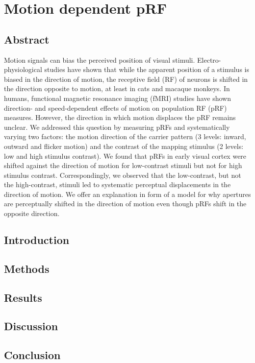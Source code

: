 \chapter{Motion dependent pRF}

\section{Abstract}
Motion signals can bias the perceived position of visual stimuli. Electro-physiological studies have shown that while the apparent position of a stimulus is biased in the direction of motion, the receptive field (RF) of neurons is shifted in the direction opposite to motion, at least in cats and macaque monkeys. In humans, functional magnetic resonance imaging (fMRI) studies have shown direction- and speed-dependent effects of motion on population RF (pRF) measures. However, the direction in which motion displaces the pRF remains unclear. We addressed this question by measuring pRFs and systematically varying two factors: the motion direction of the carrier pattern (3 levels: inward, outward and flicker motion) and the contrast of the mapping stimulus (2 levels: low and high stimulus contrast). We found that pRFs in early visual cortex were shifted against the direction of motion for low-contrast stimuli but not for high stimulus contrast. Correspondingly, we observed that the low-contrast, but not the high-contrast, stimuli led to systematic perceptual displacements in the direction of motion. We offer an explanation in form of a model for why apertures are perceptually shifted in the direction of motion even though pRFs shift in the opposite direction.


\section{Introduction}
\lipsum[1-1]

\section{Methods}
\lipsum[1-2]

\section{Results}
\lipsum[1-3]

\section{Discussion}
\lipsum[1-4]
\cite{Lakatos1970}

\section{Conclusion}
\lipsum[1-5]

\clearpage
\printbibliography[heading=subbibnumbered, title={References}]